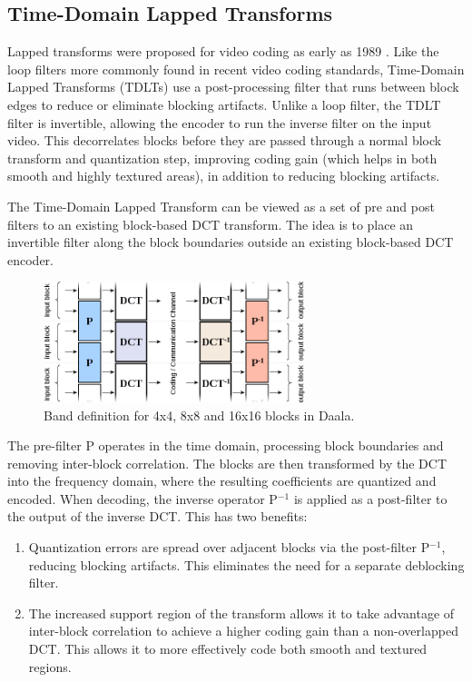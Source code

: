 \documentclass[conference, 10pt]{IEEEtran}
\begin{document}
\subsection{Time-Domain Lapped Transforms}
\label{sec:tdlt}

Lapped transforms were proposed for video coding as early as 1989 \cite{journals/tsp/MalvarS89}.
Like the loop filters more commonly found in recent video coding standards,
 Time-Domain Lapped Transforms (TDLTs) use a post-processing filter that runs between block edges to reduce or
 eliminate blocking artifacts.
Unlike a loop filter, the TDLT filter is invertible, allowing the encoder to
 run the inverse filter on the input video.
This decorrelates blocks before they are passed through a normal block
 transform and quantization step, improving coding gain (which helps in both
 smooth and highly textured areas), in addition to reducing blocking artifacts.

The Time-Domain Lapped Transform can be viewed as a set of pre and post
 filters to an existing block-based DCT transform.
The idea is to place an invertible filter along the block boundaries outside
 an existing block-based DCT encoder.

\begin{figure}[h]
\begin{center}
\noindent
  \includegraphics[natwidth=876,natheight=314,width=3in]{lapping.png}
  \caption{Band definition for 4x4, 8x8 and 16x16 blocks in Daala.}\label{fig:bands}
\end{center}
\end{figure}

The pre-filter P operates in the time domain, processing block boundaries and
 removing inter-block correlation.
The blocks are then transformed by the DCT into the frequency domain, where
 the resulting coefficients are quantized and encoded.
When decoding, the inverse operator P$^{-1}$ is applied as a post-filter to
 the output of the inverse DCT.
This has two benefits:

\begin{enumerate}
\item Quantization errors are spread over adjacent blocks via the post-filter
 P$^{-1}$, reducing blocking artifacts.
This eliminates the need for a separate deblocking filter.
\item The increased support region of the transform allows it to take
 advantage of inter-block correlation to achieve a higher coding gain than a
 non-overlapped DCT.  This allows it to more effectively code both smooth and
 textured regions.
\end{enumerate}
\end{document}
